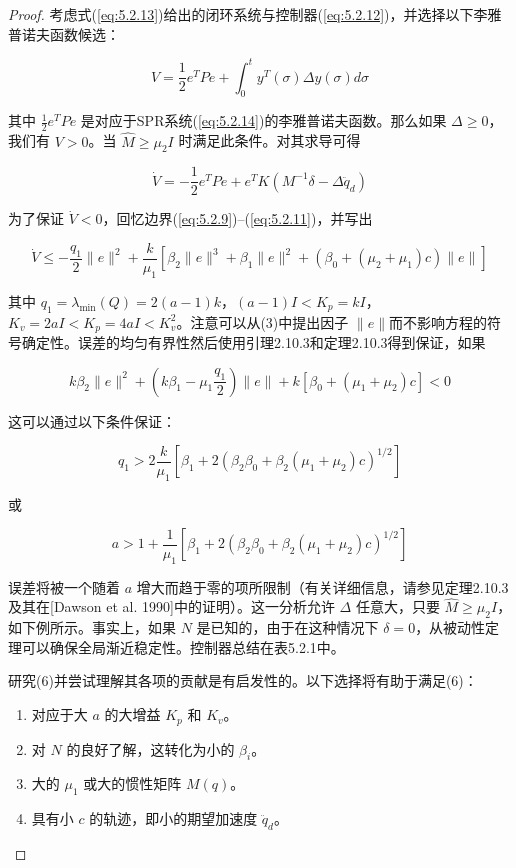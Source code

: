 \documentclass[UTF8,12pt,a4paper]{ctexart}
\begin{document}
\begin{proof}
考虑式(\ref{eq:5.2.13})给出的闭环系统与控制器(\ref{eq:5.2.12})，并选择以下李雅普诺夫函数候选：

\begin{equation}
V = \frac{1}{2}e^T P e + \int_0^t y^T(\sigma)\Delta y(\sigma) d\sigma
\end{equation}

其中 $\frac{1}{2}e^T P e$ 是对应于SPR系统(\ref{eq:5.2.14})的李雅普诺夫函数。那么如果 $\Delta \geq 0$，我们有 $V > 0$。当 $\hat{M} \geq \mu_2 I$ 时满足此条件。对其求导可得

\begin{equation}
\dot{V} = -\frac{1}{2}e^T P e + e^T K(M^{-1}\delta - \Delta\ddot{q}_d)
\end{equation}

为了保证 $\dot{V} < 0$，回忆边界(\ref{eq:5.2.9})--(\ref{eq:5.2.11})，并写出

\begin{equation}
\dot{V} \leq -\frac{q_1}{2}\|e\|^2 + \frac{k}{\mu_1}[\beta_2\|e\|^3 + \beta_1\|e\|^2 + (\beta_0 + (\mu_2 + \mu_1)c)\|e\|]
\end{equation}

其中 $q_1 = \lambda_{\min}(Q) = 2(a-1)k$，$(a-1)I < K_p = kI$，$K_v = 2aI < K_p = 4aI < K_v^2$。注意可以从(3)中提出因子 $\|e\|$而不影响方程的符号确定性。误差的均匀有界性然后使用引理2.10.3和定理2.10.3得到保证，如果

\begin{equation}
k\beta_2\|e\|^2 + \left(k\beta_1 - \mu_1\frac{q_1}{2}\right)\|e\| + k[\beta_0 + (\mu_1 + \mu_2)c] < 0
\end{equation}

这可以通过以下条件保证：

\begin{equation}
q_1 > 2\frac{k}{\mu_1}[\beta_1 + 2(\beta_2\beta_0 + \beta_2(\mu_1 + \mu_2)c)^{1/2}]
\end{equation}

或

\begin{equation}
a > 1 + \frac{1}{\mu_1}[\beta_1 + 2(\beta_2\beta_0 + \beta_2(\mu_1 + \mu_2)c)^{1/2}]
\end{equation}

误差将被一个随着 $a$ 增大而趋于零的项所限制（有关详细信息，请参见定理2.10.3及其在[Dawson et al. 1990]中的证明）。这一分析允许 $\Delta$ 任意大，只要 $\hat{M} \geq \mu_2 I$，如下例所示。事实上，如果 $N$ 是已知的，由于在这种情况下 $\delta = 0$，从被动性定理可以确保全局渐近稳定性。控制器总结在表5.2.1中。

研究(6)并尝试理解其各项的贡献是有启发性的。以下选择将有助于满足(6)：
\begin{enumerate}
    \item 对应于大 $a$ 的大增益 $K_p$ 和 $K_v$。
    \item 对 $N$ 的良好了解，这转化为小的 $\beta_i$。
    \item 大的 $\mu_1$ 或大的惯性矩阵 $M(q)$。
    \item 具有小 $c$ 的轨迹，即小的期望加速度 $\ddot{q}_d$。
\end{enumerate}
\end{proof}
\end{document}
